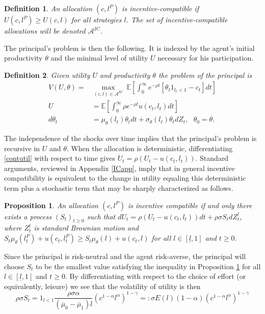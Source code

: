 \documentclass[11pt]{article}
\theoremstyle{plain}
\newtheorem{prop}[thm]{Proposition}
\newtheorem{defn}{Definition}[section]
\begin{document}
\begin{defn}\label{defnIC}
An allocation $(c,l^P)$ is incentive-compatible if $U(c,l^P) \geq U(c,l)$ for all strategies $l$. The set of incentive-compatible allocations will be denoted $\mathcal{A}^{IC}$.
\end{defn}
The principal's problem is then the following. It is indexed by the agent's initial productivity $\theta$ and the minimal level of utility $U$ necessary for his participation.
\begin{defn}\label{princprob}
Given utility $U$ and productivity $\theta$ the problem of the principal is
\begin{align*}
V(U,\theta) = & \max_{(c,l) \in \mathcal{A}^{IC}} \ \mathbb{E}{\left[\int_0^{\infty}e^{-\rho t}[\theta_t1_{l_t<1} - c_t]dt\right]}
\\ U & = \mathbb{E}{\left[\int_{0}^{\infty}\rho e^{-\rho t}u(c_t,l_t)dt\right]}
\\ d\theta_t & = \mu_{\theta}(l_t) \theta_tdt + \sigma_{\theta}(l_t) \theta_t dZ_t, \ \ \ \theta_0 = \theta.
\end{align*}
\end{defn}
The independence of the shocks over time implies that the principal's problem is recursive in $U$ and $\theta$. When the allocation is deterministic, differentiating \eqref{contutil} with respect to time gives $\dot{U}_t =  \rho {\left(U_t - u(c_t,l_t) \right)}$. Standard arguments, reviewed in Appendix \ref{ICapp}, imply that in general incentive compatibility is equivalent to the change in utility equaling this deterministic term plus a stochastic term that may be sharply characterized as follows. 
\begin{prop}\label{contprop}
An allocation $(c,l^P)$ is incentive compatible if and only there exists a process $(S_t)_{t\geq0}$ such that $dU_t = \rho{\left(U_t - u(c_t,l_t)\right)} dt + \rho \sigma S_tdZ^l_t$, where $Z^l_t$ is standard Brownian motion and $S_t \mu_{\theta}(l^P_t) + u(c_t,l_t^P) \geq  S_t \mu_{\theta}(l) + u(c_t,l)$ for all $l \in [\underline{l},1]$ and $t\geq 0$. 
\end{prop} 
Since the principal is risk-neutral and the agent risk-averse, the principal will choose $S_t$ to be the smallest value satisfying the inequality in Proposition \ref{contprop} for all $l \in [\underline{l},1]$ and $t\geq 0$. By differentiating with respect to the choice of effort (or equivalently, leisure) we see that the volatility of utility is then 
\begin{equation}
\rho \sigma S_t = 1_{l<1}\frac{\rho \sigma \alpha}{(\overline{\mu}_0 - \overline{\mu}_1)l} (c^{1-\alpha}l^{\alpha})^{1-\gamma} =: \sigma E(l)(1-\alpha)(c^{1-\alpha}l^{\alpha})^{1-\gamma}
\label{Efunc}
\end{equation} 
\end{document}
